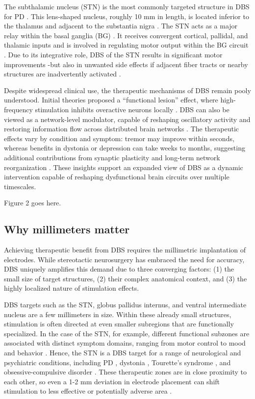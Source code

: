 The subthalamic nucleus (STN) is the most commonly targeted structure in DBS for PD \cite{Lozano2019-dv}. This lens-shaped nucleus, roughly 10 mm in length, is located inferior to the thalamus and adjacent to the substantia nigra \cite{Prasad2024-hi}. The STN acts as a major relay within the basal ganglia (BG) \cite{DeLong2007-cv}. It receives convergent cortical, pallidal, and thalamic inputs and is involved in regulating motor output within the BG circuit \cite{DeLong2007-cv,Jeon2022-wg}. Due to its integrative role, DBS of the STN results in significant motor improvements \cite{Hermann2024-tr}-but also in unwanted side effects if adjacent fiber tracts or nearby structures are inadvertently activated \cite{Kiss2007-mu,Reich2022-jf}.

Despite widespread clinical use, the therapeutic mechanisms of DBS remain pooly understood. Initial theories proposed a “functional lesion” effect, where high-frequency stimulation inhibits overactive neurons locally \cite{Benabid1987-mp, Benabid1996-jd}. DBS can also be viewed as a network-level modulator, capable of reshaping oscillatory activity and restoring information flow across distributed brain networks \cite{Miocinovic2013-rs,Herrington2016-xr}. The therapeutic effects vary by condition and symptom: tremor may improve within seconds, whereas benefits in dystonia or depression can take weeks to months, suggesting additional contributions from synaptic plasticity and long-term network reorganization \cite{Ashkan2017-hb}. These insights support an expanded view of DBS as a dynamic intervention capable of reshaping dysfunctional brain circuits over multiple timescales.

Figure 2 goes here. 

\subsection{Why millimeters matter}
\label{sec:whymm}
Achieving therapeutic benefit from DBS requires the millimetric implantation of electrodes. While stereotactic neurosurgery has embraced the need for accuracy, DBS uniquely amplifies this demand due to three converging factors: (1) the small size of target structures, (2) their complex anatomical context, and (3) the highly localized nature of stimulation effects.

DBS targets such as the STN, globus pallidus internus, and ventral intermediate nucleus are a few millimeters in size. Within these already small structures, stimulation is often directed at even smaller subregions that are functionally specialized. In the case of the STN, for example, different functional subzones are associated with distinct symptom domains, ranging from motor control to mood and behavior \cite{Hollunder2024-wc}. Hence, the STN is a DBS target for a range of neurological and psychiatric conditions, including PD \cite{Deuschl2006-ar}, dystonia \cite{Ostrem2017-rw}, Tourette’s syndrome \cite{Mallet2008-ky}, and obsessive-compulsive disorder \cite{Dai2022-uy}. These therapeutic zones are in close proximity to each other, so even a 1-2 mm deviation in electrode placement can shift stimulation to less effective or potentially adverse area \cite{Akram2017-ru}.

